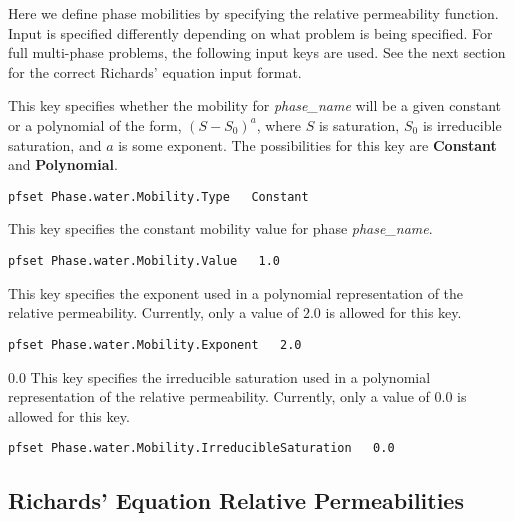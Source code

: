 Here we define phase mobilities by specifying the
relative permeability function.  Input is specified differently depending on
what problem is being specified.  For full multi-phase problems, the following
input keys are used.  See the next section for the correct Richards' equation 
input format.

{
This key specifies whether the mobility for {\em phase\_name} will be a given
constant or a polynomial of the form,  
$(S - S_0)^{a}$, where $S$ is saturation, $S_0$ is
irreducible saturation, and $a$ is some exponent.
The possibilities for this key are {\bf Constant} and {\bf Polynomial}.
}
\begin{display}\begin{verbatim}
pfset Phase.water.Mobility.Type   Constant
\end{verbatim}\end{display}

{
This key specifies the constant mobility value for phase {\em phase\_name}.
}
\begin{display}\begin{verbatim}
pfset Phase.water.Mobility.Value   1.0
\end{verbatim}\end{display}

{
This key specifies the exponent used in a polynomial representation of the
relative permeability.  Currently, only a value of $2.0$ is allowed for this
key. 
}
\begin{display}\begin{verbatim}
pfset Phase.water.Mobility.Exponent   2.0
\end{verbatim}\end{display}

{0.0}
{
This key specifies the irreducible saturation 
used in a polynomial representation of the relative permeability.
Currently, only a value of 0.0 is allowed for this key.
}
\begin{display}\begin{verbatim}
pfset Phase.water.Mobility.IrreducibleSaturation   0.0
\end{verbatim}\end{display}


\subsection{Richards' Equation Relative Permeabilities}

